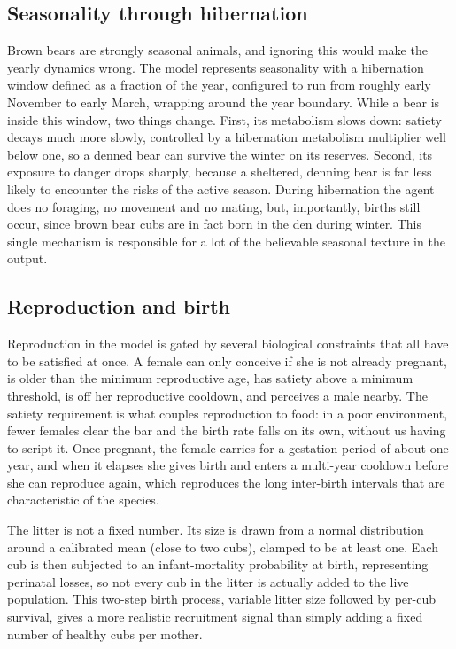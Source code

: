 \subsection{Seasonality through hibernation}

Brown bears are strongly seasonal animals, and ignoring this would make the yearly dynamics wrong. The model represents seasonality with a hibernation window defined as a fraction of the year, configured to run from roughly early November to early March, wrapping around the year boundary. While a bear is inside this window, two things change. First, its metabolism slows down: satiety decays much more slowly, controlled by a hibernation metabolism multiplier well below one, so a denned bear can survive the winter on its reserves. Second, its exposure to danger drops sharply, because a sheltered, denning bear is far less likely to encounter the risks of the active season. During hibernation the agent does no foraging, no movement and no mating, but, importantly, births still occur, since brown bear cubs are in fact born in the den during winter. This single mechanism is responsible for a lot of the believable seasonal texture in the output.

\subsection{Reproduction and birth}

Reproduction in the model is gated by several biological constraints that all have to be satisfied at once. A female can only conceive if she is not already pregnant, is older than the minimum reproductive age, has satiety above a minimum threshold, is off her reproductive cooldown, and perceives a male nearby. The satiety requirement is what couples reproduction to food: in a poor environment, fewer females clear the bar and the birth rate falls on its own, without us having to script it. Once pregnant, the female carries for a gestation period of about one year, and when it elapses she gives birth and enters a multi-year cooldown before she can reproduce again, which reproduces the long inter-birth intervals that are characteristic of the species.

The litter is not a fixed number. Its size is drawn from a normal distribution around a calibrated mean (close to two cubs), clamped to be at least one. Each cub is then subjected to an infant-mortality probability at birth, representing perinatal losses, so not every cub in the litter is actually added to the live population. This two-step birth process, variable litter size followed by per-cub survival, gives a more realistic recruitment signal than simply adding a fixed number of healthy cubs per mother.

